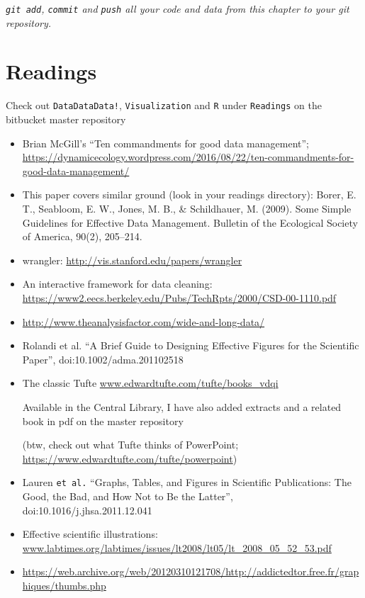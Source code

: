 \begin{center}
	\it {\tt git add}, {\tt commit} and {\tt push} all your code and data 
	from this chapter to your git repository.
\end{center}

\section{Readings}
Check out {\tt DataDataData!}, {\tt Visualization} and {\tt R} under 
{\tt Readings} on the bitbucket master repository
\begin{itemize}
   
  \item Brian McGill's ``Ten commandments for good data management''; \url{https://dynamicecology.wordpress.com/2016/08/22/ten-commandments-for-good-data-management/}

  \item This paper covers similar ground (look in your readings 
  directory): Borer, E. T., Seabloom, E. W., Jones, M. B., \& 
  Schildhauer, M. (2009). Some Simple Guidelines for Effective Data 
  Management. Bulletin of the Ecological Society of America, 90(2), 
  205--214.
  
  \item wrangler: \url{http://vis.stanford.edu/papers/wrangler}

  \item An interactive framework for data cleaning: \url{https://www2.eecs.berkeley.edu/Pubs/TechRpts/2000/CSD-00-1110.pdf}

  \item \url{http://www.theanalysisfactor.com/wide-and-long-data/}

	\item Rolandi et al. ``A Brief Guide to Designing Effective
	Figures for the Scientific Paper'', doi:10.1002/adma.201102518

	\item The classic Tufte \url{www.edwardtufte.com/tufte/books\_vdqi}

   Available in the Central Library, I have also added extracts and a 
    related book in pdf on the master repository

		(btw, check out what Tufte thinks of PowerPoint; \url{ https://www.edwardtufte.com/tufte/powerpoint})\\

	\item Lauren {\tt et al.} ``Graphs, Tables, and Figures in
	Scientific Publications: The Good, the Bad, and How Not to Be the
	Latter'', doi:10.1016/j.jhsa.2011.12.041

  \item Effective scientific illustrations: 
    \url{www.labtimes.org/labtimes/issues/lt2008/lt05/lt\_2008\_05\_52\_53.pdf} 

  \item 
    \url{https://web.archive.org/web/20120310121708/http://addictedtor.free.fr/graphiques/thumbs.php}

\end{itemize}
